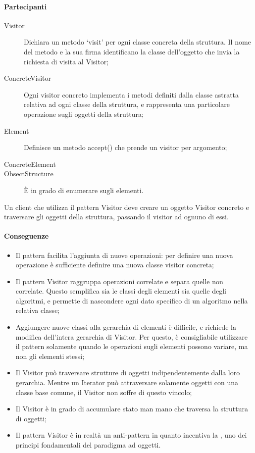 \paragraph{Partecipanti}
\label{par:partecipanti}

\begin{description}
  \item[Visitor] Dichiara un metodo `visit' per ogni classe concreta della
  struttura. Il nome del metodo e la sua firma identificano la classe
  dell'oggetto che invia la richiesta di visita al Visitor;
  \item[ConcreteVisitor] Ogni visitor concreto implementa i metodi definiti
  dalla classe astratta relativa ad ogni classe della struttura, e rappresenta
  una particolare operazione sugli oggetti della struttura;
  \item[Element] Definisce un metodo accept() che prende un visitor per
  argomento;
  \item[ConcreteElement]
  \item[ObsectStructure] \`E in grado di enumerare sugli elementi.
\end{description}

Un client che utilizza il pattern Visitor deve creare un oggetto Visitor
concreto e traversare gli oggetti della struttura, passando il visitor ad ognuno
di essi.

\paragraph{Conseguenze}
\label{par:conseguenze}

\begin{itemize}
  \item Il pattern facilita l'aggiunta di nuove operazioni: per definire una
  nuova operazione è sufficiente definire una nuova classe visitor concreta;
  \item Il pattern Visitor raggruppa operazioni correlate e separa quelle non
  correlate. Questo semplifica sia le classi degli elementi sia quelle degli
  algoritmi, e permette di nascondere ogni dato specifico di un algoritmo nella
  relativa classe;
  \item Aggiungere nuove classi alla gerarchia di elementi è difficile, e
  richiede la modifica dell'intera gerarchia di Visitor. Per questo, è
  consigliabile utilizzare il pattern solamente quando le operazioni sugli
  elementi possono variare, ma non gli elementi stessi;
  \item Il Visitor può traversare strutture di oggetti indipendentemente dalla
  loro gerarchia. Mentre un Iterator può attraversare solamente oggetti con una
  classe base comune, il Visitor non soffre di questo vincolo;
  \item Il Visitor è in grado di accumulare stato man mano che traversa la
  struttura di oggetti;
  \item Il pattern Visitor è in realtà un anti-pattern in quanto incentiva la
  , uno dei principi fondamentali del
  paradigma ad
  oggetti.
\end{itemize}

